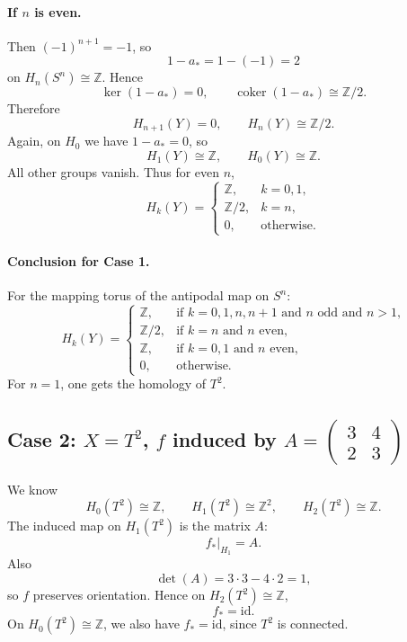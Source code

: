 \documentclass[12pt,a4paper]{article}
\theoremstyle{notespace}
\begin{document}
\paragraph{If \(n\) is even.}
Then \((-1)^{n+1}=-1\), so
\[
1-a_*=1-(-1)=2
\]
on \(H_n(S^n)\cong \mathbb Z\). Hence
\[
\ker(1-a_*)=0,\qquad \operatorname{coker}(1-a_*)\cong \mathbb Z/2.
\]
Therefore
\[
H_{n+1}(Y)=0,\qquad H_n(Y)\cong \mathbb Z/2.
\]
Again, on \(H_0\) we have \(1-a_*=0\), so
\[
H_1(Y)\cong \mathbb Z,\qquad H_0(Y)\cong \mathbb Z.
\]
All other groups vanish. Thus for even \(n\),
\[
H_k(Y)=
\begin{cases}
	\mathbb Z, & k=0,1,\\
	\mathbb Z/2, & k=n,\\
	0, & \text{otherwise}.
\end{cases}
\]

\paragraph{Conclusion for Case 1.}
For the mapping torus of the antipodal map on \(S^n\):
\[
H_k(Y)=
\begin{cases}
	\mathbb Z, & \text{if $k=0,1,n,n+1$ and $n$ odd and $n>1$,}\\
	\mathbb Z/2, & \text{if $k=n$ and $n$ even,}\\
	\mathbb Z, & \text{if $k=0,1$ and $n$ even,}\\
	0, & \text{otherwise.}
\end{cases}
\]
For \(n=1\), one gets the homology of \(T^2\).

\subsection*{Case 2: \(X=T^2\), \(f\) induced by \(A=\begin{pmatrix}3&4\\2&3\end{pmatrix}\)}

We know
\[
H_0(T^2)\cong \mathbb Z,\qquad
H_1(T^2)\cong \mathbb Z^2,\qquad
H_2(T^2)\cong \mathbb Z.
\]
The induced map on \(H_1(T^2)\) is the matrix \(A\):
\[
f_*|_{H_1}=A.
\]
Also
\[
\det(A)=3\cdot 3-4\cdot 2=1,
\]
so \(f\) preserves orientation. Hence on \(H_2(T^2)\cong \mathbb Z\),
\[
f_*=\mathrm{id}.
\]
On \(H_0(T^2)\cong \mathbb Z\), we also have \(f_*=\mathrm{id}\), since \(T^2\) is connected.
\end{document}
